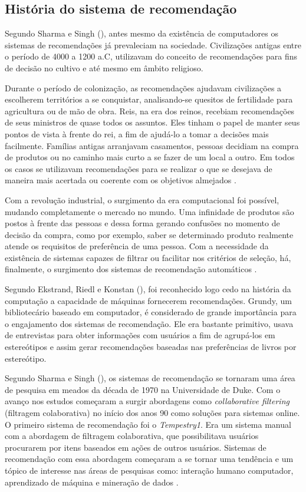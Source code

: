 \subsection{História do sistema de recomendação}

Segundo Sharma e Singh (\citeyear{Sharma:2016}), antes mesmo da existência de computadores os sistemas de recomendações já prevaleciam na sociedade. Civilizações antigas entre o período de 4000 a 1200 a.C, utilizavam do conceito de recomendações para fins de decisão no cultivo e até mesmo em âmbito religioso.

Durante o período de colonização, as recomendações ajudavam civilizações a escolherem territórios a se conquistar, analisando-se quesitos de fertilidade para agricultura ou de mão de obra. Reis, na era dos reinos, recebiam recomendações de seus ministros de quase todos os assuntos. Eles tinham o papel de manter seus pontos de vista à frente do rei, a fim de ajudá-lo a tomar a decisões mais facilmente. Famílias antigas arranjavam casamentos, pessoas decidiam na compra de produtos ou no caminho mais curto a se fazer de um local a outro. Em todos os casos se utilizavam recomendações para se realizar o que se desejava de maneira mais acertada ou coerente com os objetivos almejados \cite{Sharma:2016}.

Com a revolução industrial, o surgimento da era computacional foi possível, mudando completamente o mercado no mundo. Uma infinidade de produtos são postos à frente das pessoas e dessa forma gerando confusões no momento de decisão da compra, como por exemplo, saber se determinado produto realmente atende os requisitos de preferência de uma pessoa. Com a necessidade da existência de sistemas capazes de filtrar ou facilitar nos critérios de seleção, há, finalmente, o surgimento dos sistemas de recomendação automáticos \cite{Sharma:2016}.

Segundo Ekstrand, Riedl e Konstan (\citeyear{Ekstrand:2011:CFR:2185827.2185828}), foi reconhecido logo cedo na história da computação a capacidade de máquinas fornecerem recomendações. Grundy, um bibliotecário baseado em computador, é considerado de grande importância para o engajamento dos sistemas de recomendação. Ele era bastante primitivo, usava de entrevistas para obter informações com usuários a fim de agrupá-los em estereótipos e assim gerar recomendações  baseadas nas preferências de livros por estereótipo.

Segundo Sharma e Singh (\citeyear{Sharma:2016}), os sistemas de recomendação se tornaram uma área de pesquisa em meados da década de 1970 na Universidade de Duke. Com o avanço nos estudos começaram a surgir abordagens como \textit{collaborative filtering} (filtragem colaborativa) no início dos anos 90 como soluções para sistemas online. O primeiro sistema de recomendação foi o \textit{Tempestry1}. Era um sistema manual com a abordagem de filtragem colaborativa, que possibilitava usuários procurarem por itens baseados em ações de outros usuários. Sistemas de recomendação com essa abordagem começaram a se tornar uma tendência e um tópico de interesse nas áreas de pesquisas como: interação humano computador, aprendizado de máquina e mineração de dados \cite{Ekstrand:2011:CFR:2185827.2185828}. 

